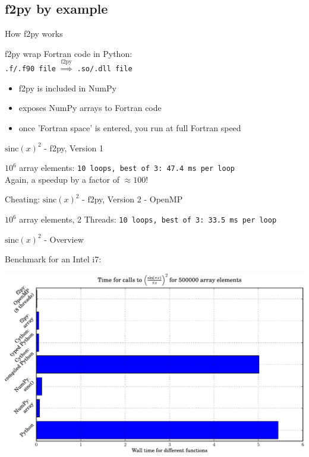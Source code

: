 \subsection{f2py by example}

\begin{frame}{How f2py works}

\begin{exbox}{f2py}
wrap Fortran code in Python:\\[1ex]
{\texttt{.f/.f90 file}} $\stackrel{\text{f2py}}{\Longrightarrow}$ {\texttt{.so/.dll file}}
\end{exbox}

\begin{itemize}
    \item f2py is included in NumPy
    \item exposes NumPy arrays to Fortran code
    \item once 'Fortran space' is entered, you run at full Fortran speed
\end{itemize}

\end{frame}

\begin{frame}[fragile]{$\mathrm{sinc}(x)^{2}$ - f2py, Version 1}



\pause
$10^{6}$ array elements: {\texttt{10 loops, best of 3: 47.4 ms per loop}}\\
Again, a \alert{speedup by a factor of $\approx 100$}!

\end{frame}

\begin{frame}[fragile]{Cheating: $\mathrm{sinc}(x)^{2}$ - f2py, Version 2 - OpenMP}



\pause
$10^{6}$ array elements, 2 Threads: {\texttt{10 loops, best of 3: 33.5 ms per loop}}
\end{frame}

\begin{frame}{$\mathrm{sinc}(x)^{2}$ - Overview}

Benchmark for an Intel i7:

\begin{center}
    \includegraphics[width=1.0\textwidth]{Figures/benchmark}
\end{center}

\end{frame}

